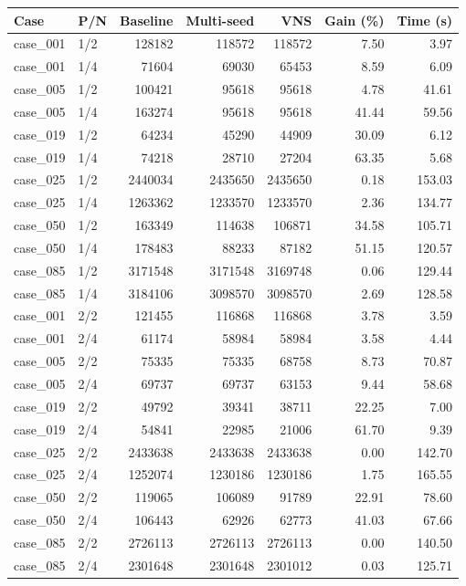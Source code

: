 \begin{tabular}{llrrrrr}
\toprule
Case & P/N & Baseline & Multi-seed & VNS & Gain (\%) & Time (s) \\
\midrule
case\_001 & 1/2 & 128182 & 118572 & 118572 & 7.50 & 3.97 \\
case\_001 & 1/4 & 71604 & 69030 & 65453 & 8.59 & 6.09 \\
case\_005 & 1/2 & 100421 & 95618 & 95618 & 4.78 & 41.61 \\
case\_005 & 1/4 & 163274 & 95618 & 95618 & 41.44 & 59.56 \\
case\_019 & 1/2 & 64234 & 45290 & 44909 & 30.09 & 6.12 \\
case\_019 & 1/4 & 74218 & 28710 & 27204 & 63.35 & 5.68 \\
case\_025 & 1/2 & 2440034 & 2435650 & 2435650 & 0.18 & 153.03 \\
case\_025 & 1/4 & 1263362 & 1233570 & 1233570 & 2.36 & 134.77 \\
case\_050 & 1/2 & 163349 & 114638 & 106871 & 34.58 & 105.71 \\
case\_050 & 1/4 & 178483 & 88233 & 87182 & 51.15 & 120.57 \\
case\_085 & 1/2 & 3171548 & 3171548 & 3169748 & 0.06 & 129.44 \\
case\_085 & 1/4 & 3184106 & 3098570 & 3098570 & 2.69 & 128.58 \\
case\_001 & 2/2 & 121455 & 116868 & 116868 & 3.78 & 3.59 \\
case\_001 & 2/4 & 61174 & 58984 & 58984 & 3.58 & 4.44 \\
case\_005 & 2/2 & 75335 & 75335 & 68758 & 8.73 & 70.87 \\
case\_005 & 2/4 & 69737 & 69737 & 63153 & 9.44 & 58.68 \\
case\_019 & 2/2 & 49792 & 39341 & 38711 & 22.25 & 7.00 \\
case\_019 & 2/4 & 54841 & 22985 & 21006 & 61.70 & 9.39 \\
case\_025 & 2/2 & 2433638 & 2433638 & 2433638 & 0.00 & 142.70 \\
case\_025 & 2/4 & 1252074 & 1230186 & 1230186 & 1.75 & 165.55 \\
case\_050 & 2/2 & 119065 & 106089 & 91789 & 22.91 & 78.60 \\
case\_050 & 2/4 & 106443 & 62926 & 62773 & 41.03 & 67.66 \\
case\_085 & 2/2 & 2726113 & 2726113 & 2726113 & 0.00 & 140.50 \\
case\_085 & 2/4 & 2301648 & 2301648 & 2301012 & 0.03 & 125.71 \\
\bottomrule
\end{tabular}
